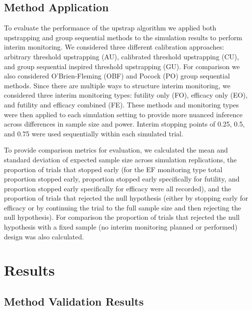 \documentclass[Afour,sageh,times,square,numbers]{sagej}
\begin{document}
\subsection{Method Application}

To evaluate the performance of the upstrap algorithm we applied both upstrapping and group sequential methods to the simulation results to perform interim monitoring.  We considered three different calibration approaches: arbitrary threshold upstrapping (AU), calibrated threshold upstrapping (CU), and group sequential inspired threshold upstrapping (GU).  For comparison we also considered O’Brien-Fleming (OBF) and Pocock (PO) group sequential methods.  Since there are multiple ways to structure interim monitoring, we considered three interim monitoring types: futility only (FO), efficacy only (EO), and futility and efficacy combined (FE).  These methods and monitoring types were then applied to each simulation setting to provide more nuanced inference across differences in sample size and power.  Interim stopping points of 0.25, 0.5, and 0.75 were used sequentially within each simulated trial.

To provide comparison metrics for evaluation, we calculated the mean and standard deviation of expected sample size across simulation replications, the proportion of trials that stopped early (for the EF monitoring type total proportion stopped early, proportion stopped early specifically for futility, and proportion stopped early specifically for efficacy were all recorded), and the proportion of trials that rejected the null hypothesis (either by stopping early for efficacy or by continuing the trial to the full sample size and then rejecting the null hypothesis).  For comparison the proportion of trials that rejected the null hypothesis with a fixed sample (no interim monitoring planned or performed) design was also calculated.

\section{Results}

\subsection{Method Validation Results}
\end{document}
